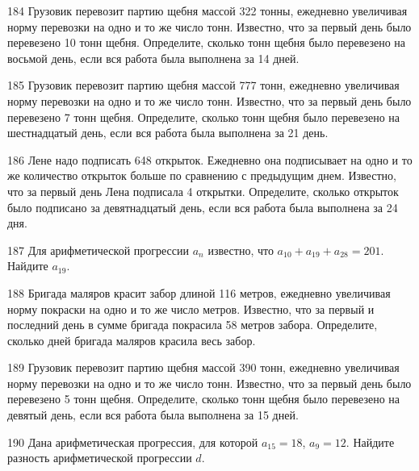 \documentclass[4apaper]{article}
\begin{document}
\begin{taskBN}{184}
Грузовик перевозит партию щебня массой 322 тонны, ежедневно увеличивая норму перевозки на одно и то же число тонн. Известно, что за первый день было перевезено 10 тонн щебня. Определите, сколько тонн щебня было перевезено на восьмой день, если вся работа была выполнена за 14 дней.
\end{taskBN}

\begin{taskBN}{185}
Грузовик перевозит партию щебня массой 777 тонн, ежедневно увеличивая норму перевозки на одно и то же число тонн. Известно, что за первый день было перевезено 7 тонн щебня. Определите, сколько тонн щебня было перевезено на шестнадцатый день, если вся работа была выполнена за 21 день.
\end{taskBN}

\begin{taskBN}{186}
Лене надо подписать 648 открыток. Ежедневно она подписывает на одно и то же количество открыток больше по сравнению с предыдущим днем. Известно, что за первый день Лена подписала 4 открытки. Определите, сколько открыток было подписано за девятнадцатый день, если вся работа была выполнена за 24 дня.
\end{taskBN}

\begin{taskBN}{187}
Для арифметической прогрессии ${a_n}$ известно, что $a_{10} + a_{19} + a_{28}= 201$. Найдите $a_{19}$.
\end{taskBN}

\begin{taskBN}{188}
 Бригада маляров красит забор длиной 116 метров, ежедневно увеличивая норму покраски на одно и то же число метров. Известно, что за первый и последний день в сумме бригада покрасила 58 метров забора.  Определите, сколько дней бригада маляров красила весь забор. 
\end{taskBN}

\begin{taskBN}{189}
Грузовик перевозит партию щебня массой 390 тонн, ежедневно увеличивая норму перевозки на одно и то же число тонн. Известно, что за первый день было перевезено 5 тонн щебня. Определите, сколько тонн щебня было перевезено на девятый день, если вся работа была выполнена за 15 дней.
\end{taskBN}

\begin{taskBN}{190}
Дана арифметическая прогрессия, для которой $a_{15} = 18$, $a_{9} = 12$. Найдите разность арифметической прогрессии $d$.
\end{taskBN}
\end{document}

